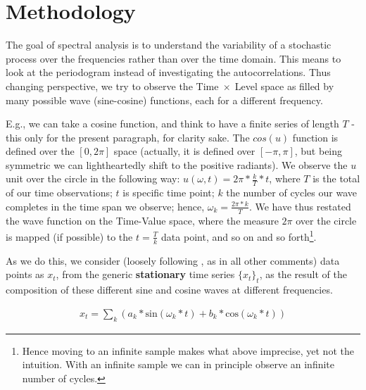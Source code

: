 \documentclass[12pt]{article} %
\begin{document}
\section{Methodology}

The goal of spectral analysis is to understand the variability of a stochastic process over the frequencies rather than over the time domain. This means to look at the periodogram instead of investigating the autocorrelations. Thus changing perspective, we try to observe the Time$\;\times\;$Level space as filled by many possible wave (sine-cosine) functions, each for a different frequency.

E.g., we can take a cosine function, and think to have a finite series of length $T$ - this only for the present paragraph, for clarity sake. The $cos(u)$ function is defined over the $[0,2\pi]$ space (actually, it is defined over $[-\pi,\pi]$, but being symmetric we can lightheartedly shift to the positive radiants). We observe the $u$ unit over the circle in the following way: $u(\omega, t)=2\pi*\frac{k}{T}*t$, where $T$ is the total of our time observations; $t$ is specific time point; $k$ the number of cycles our wave completes in the time span we observe; hence, $\omega_k=\frac{2\pi*k}{T}$.  We have thus restated the wave function on the Time-Value space, where the measure $2\pi$ over the circle is mapped (if possible) to the $t=\frac{T}{k}$ data point, and so on and so forth\footnote{
Hence moving to an infinite sample makes what above imprecise, yet not the intuition. With an infinite sample we can in principle observe an infinite number of cycles.}.

As we do this, we consider (loosely following \citet{hammy}, as in all other comments) data points as $x_t$, from the generic {\bf stationary} time series $\{x_t\}_t$, as the result of the composition of these different sine and cosine waves at different frequencies. 

\begin{equation}
\begin{aligned}
x_t=\sum_k(a_k*\text{sin}(\omega_k*t)+b_k*\text{cos}(\omega_k*t))
\end{aligned}
\end{equation}
\end{document}

